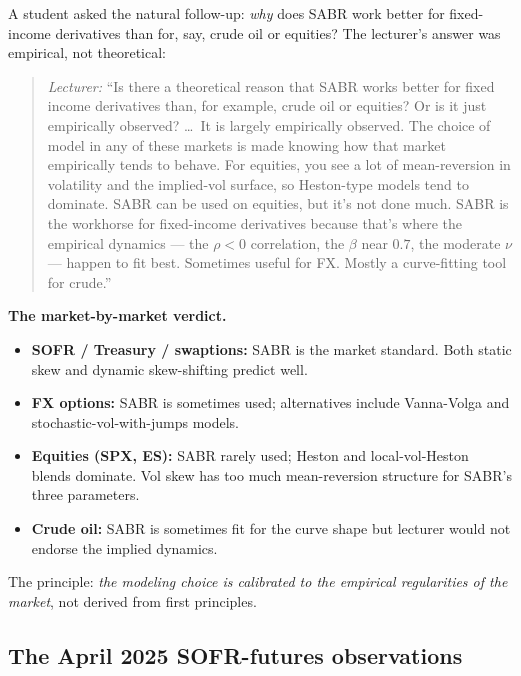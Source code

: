 A student asked the natural follow-up: \emph{why} does SABR work
better for fixed-income derivatives than for, say, crude oil or
equities? The lecturer's answer was empirical, not theoretical:

\begin{quote}
\emph{Lecturer:} ``Is there a theoretical reason that SABR works
better for fixed income derivatives than, for example, crude oil or
equities? Or is it just empirically observed? \ldots\ It is largely
empirically observed. The choice of model in any of these markets
is made knowing how that market empirically tends to behave. For
equities, you see a lot of mean-reversion in volatility and the
implied-vol surface, so Heston-type models tend to dominate. SABR
can be used on equities, but it's not done much. SABR is the
workhorse for fixed-income derivatives because that's where the
empirical dynamics --- the $\rho < 0$ correlation, the $\beta$ near
$0.7$, the moderate $\nu$ --- happen to fit best. Sometimes useful
for FX. Mostly a curve-fitting tool for crude.''
\end{quote}

\begin{keyblock}
\textbf{The market-by-market verdict.}
\begin{itemize}
  \item \textbf{SOFR / Treasury / swaptions:} SABR is the market
        standard. Both static skew and dynamic skew-shifting predict
        well.
  \item \textbf{FX options:} SABR is sometimes used; alternatives
        include Vanna-Volga and stochastic-vol-with-jumps models.
  \item \textbf{Equities (SPX, ES):} SABR rarely used; Heston and
        local-vol-Heston blends dominate. Vol skew has too much
        mean-reversion structure for SABR's three parameters.
  \item \textbf{Crude oil:} SABR is sometimes fit for the curve
        shape but lecturer would not endorse the implied dynamics.
\end{itemize}
The principle: \emph{the modeling choice is calibrated to the
empirical regularities of the market}, not derived from first
principles.
\end{keyblock}

\subsection{The April 2025 SOFR-futures observations}\label{L8-sec:apr25}

